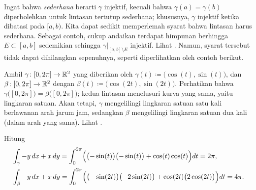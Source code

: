 Ingat bahwa \emph{sederhana} berarti $\gamma$ injektif, kecuali bahwa
$\gamma(a)=\gamma(b)$ diperbolehkan untuk lintasan tertutup sederhana; khususnya,
$\gamma$ injektif ketika dibatasi pada $[a,b)$.
Kita dapat sedikit memperlemah syarat bahwa lintasan harus sederhana.
Sebagai contoh, cukup andaikan terdapat himpunan berhingga $E \subset [a,b]$
sedemikian sehingga
$\gamma|_{[a,b]\setminus E}$ injektif.
Lihat .  Namun, syarat tersebut tidak dapat
dihilangkan sepenuhnya, seperti diperlihatkan oleh contoh berikut.

\begin{example}
Ambil $\gamma \colon [0,2\pi] \to \R^2$ yang diberikan oleh $\gamma(t) \coloneqq
\bigl(\cos(t),\sin(t)\bigr)$, dan
$\beta \colon [0,2\pi] \to \R^2$ dengan $\beta(t) \coloneqq
\bigl(\cos(2t),\sin(2t)\bigr)$.  Perhatikan bahwa
$\gamma\bigl([0,2\pi]\bigr) = \beta\bigl([0,2\pi]\bigr)$; kedua lintasan menelusuri
kurva yang sama, yaitu lingkaran satuan.  Akan tetapi, $\gamma$ mengelilingi lingkaran
satuan satu kali berlawanan arah jarum jam, sedangkan $\beta$ mengelilingi
lingkaran satuan dua kali (dalam arah yang sama). 
Lihat .
\begin{myfigureht}
\caption{Lintasan lingkaran yang ditelusuri satu kali oleh
$\gamma \colon [0,2\pi] \to \R^2$
dan dua kali oleh
$\beta \colon [0,2\pi] \to \R^2$.\label{fig:circlepathrepar2}}
\end{myfigureht}

Hitung
\begin{align*}
& \int_{\gamma} -y\, dx + x\,dy
=
\int_0^{2\pi}
\Bigl( \bigl(-\sin(t) \bigr) \bigl(-\sin(t) \bigr) + \cos(t) \cos(t) \Bigr) dt
=
2 \pi,\\
& \int_{\beta} -y\, dx + x\,dy
=
\int_0^{2\pi}
\Bigl( \bigl(-\sin(2t) \bigr) \bigl(-2\sin(2t) \bigr) + \cos(2t)
\bigl(2\cos(2t)\bigr) \Bigr) dt
=
4 \pi.
\end{align*}
\end{example}


